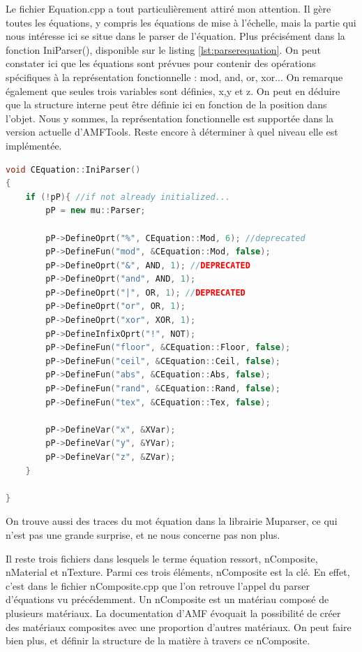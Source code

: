 \documentclass{tnreport}
\begin{document}
Le fichier Equation.cpp a tout particulièrement attiré mon attention. Il gère toutes les équations, y compris les équations de mise à l'échelle, mais la partie qui nous intéresse ici se situe dans le parser de l'équation. Plus précisément dans la fonction IniParser(), disponible sur le listing \ref{lst:parserequation}. On peut constater ici que les équations sont prévues pour contenir des opérations spécifiques à la représentation fonctionnelle : mod, and, or, xor... On remarque également que seules trois variables sont définies, x,y et z. On peut en déduire que la structure interne peut être définie ici en fonction de la position dans l'objet. Nous y sommes, la représentation fonctionnelle est supportée dans la version actuelle d'AMFTools. Reste encore à déterminer à quel niveau elle est implémentée. 

\begin{lstlisting}[language=c++, caption={parser d'équations}, label={lst:parserequation}]
void CEquation::IniParser()
{
	if (!pP){ //if not already initialized...
		pP = new mu::Parser;

		pP->DefineOprt("%", CEquation::Mod, 6); //deprecated
		pP->DefineFun("mod", &CEquation::Mod, false);
		pP->DefineOprt("&", AND, 1); //DEPRECATED
		pP->DefineOprt("and", AND, 1);
		pP->DefineOprt("|", OR, 1); //DEPRECATED
		pP->DefineOprt("or", OR, 1);
		pP->DefineOprt("xor", XOR, 1);
		pP->DefineInfixOprt("!", NOT);
		pP->DefineFun("floor", &CEquation::Floor, false);
		pP->DefineFun("ceil", &CEquation::Ceil, false);
		pP->DefineFun("abs", &CEquation::Abs, false);
		pP->DefineFun("rand", &CEquation::Rand, false);
		pP->DefineFun("tex", &CEquation::Tex, false);
	
		pP->DefineVar("x", &XVar);
		pP->DefineVar("y", &YVar);
		pP->DefineVar("z", &ZVar);
	}
	
}
\end{lstlisting}

On trouve aussi des traces du mot équation dans la librairie Muparser, ce qui n'est pas une grande surprise, et ne nous concerne pas non plus.

Il reste trois fichiers dans lesquels le terme équation ressort, nComposite, nMaterial et nTexture. Parmi ces trois éléments, nComposite est la clé. En effet, c'est dans le fichier nComposite.cpp que l'on retrouve l'appel du parser d'équations vu précédemment. Un nComposite est un matériau composé de plusieurs matériaux. La documentation d'AMF évoquait la possibilité de créer des matériaux composites avec une proportion d'autres matériaux. On peut faire bien plus, et définir la structure de la matière à travers ce nComposite.
\end{document}

